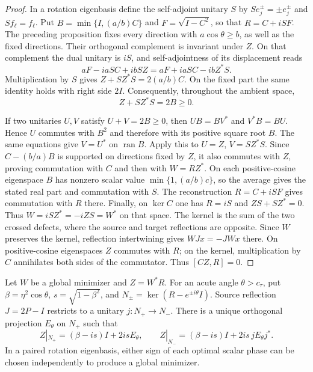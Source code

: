 \begin{proof}
In a rotation eigenbasis define the self-adjoint unitary $S$ by
$Se_j^\pm=\pm e_j^\pm$ and $Sf_\ell=f_\ell$. Put
$B=\min\{I,(a/b)C\}$ and $F=\sqrt{I-C^2}$, so that
$R=C+iSF$. The preceding proposition fixes every direction with
$a\cos\theta\geq b$, as well as the fixed directions. Their orthogonal
complement is invariant under $Z$. On that complement the dual unitary
is $iS$, and self-adjointness of its displacement reads
\[
 aF-iaSC+ibSZ=aF+iaSC-ibZ^*S.
\]
Multiplication by $S$ gives $Z+SZ^*S=2(a/b)C$. On the fixed part
the same identity holds with right side $2I$. Consequently, throughout
the ambient space,
\[
 Z+SZ^*S=2B\geq0.
\]

If two unitaries $U,V$ satisfy $U+V=2B\geq0$, then
$UB=BV^*$ and $V^*B=BU$. Hence $U$ commutes with $B^2$ and therefore
with its positive square root $B$. The same equations give $V=U^*$
on $\operatorname{ran}B$. Apply this to $U=Z$, $V=SZ^*S$.
Since $C-(b/a)B$ is supported on directions fixed by $Z$, it also
commutes with $Z$, proving commutation with $C$ and then with $W=RZ^*$.
On each positive-cosine eigenspace $B$ has nonzero scalar value
$\min\{1,(a/b)c\}$, so the average gives the stated real part and
commutation with $S$. The reconstruction $R=C+iSF$ gives commutation
with $R$ there. Finally, on $\ker C$ one has $R=iS$ and
$ZS+SZ^*=0$. Thus $W=iSZ^*=-iZS=W^*$ on that space.
The kernel is the sum of the two crossed defects, where the source
and target reflections are opposite. Since $W$ preserves the kernel,
reflection intertwining gives $WJx=-JWx$ there. On positive-cosine
eigenspaces $Z$ commutes with $R$; on the kernel, multiplication by $C$
annihilates both sides of the commutator. Thus $[CZ,R]=0$.
\end{proof}

\begin{proposition}
\label{prop:smoothed-matching-phases}
Let $W$ be a global minimizer and $Z=W^*R$. For an acute angle
$\theta>c_\tau$, put $\beta=\eta^2\cos\theta$,
$s=\sqrt{1-\beta^2}$, and
$N_\pm=\ker(R-e^{\pm i\theta}I)$. Source reflection
$J=2P-I$ restricts to a unitary $j:N_+\to N_-$.
There is a unique orthogonal projection $E_\theta$ on $N_+$ such that
\[
 Z|_{N_+}=(\beta-is)I+2isE_\theta,\qquad
 Z|_{N_-}=(\beta-is)I+2is\,jE_\theta j^*.
\]
In a paired rotation eigenbasis, either sign of each optimal scalar
phase can be chosen independently to produce a global minimizer.
\end{proposition}

